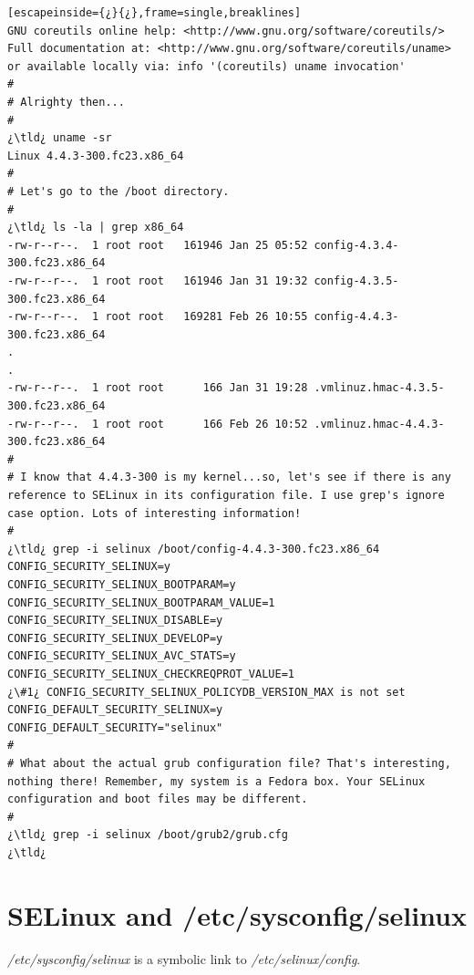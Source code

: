 \begin{lstlisting}[escapeinside={¿}{¿},frame=single,breaklines]
GNU coreutils online help: <http://www.gnu.org/software/coreutils/>
Full documentation at: <http://www.gnu.org/software/coreutils/uname>
or available locally via: info '(coreutils) uname invocation'
#
# Alrighty then...
#
¿\tld¿ uname -sr
Linux 4.4.3-300.fc23.x86_64
#
# Let's go to the /boot directory.
#
¿\tld¿ ls -la | grep x86_64
-rw-r--r--.  1 root root   161946 Jan 25 05:52 config-4.3.4-300.fc23.x86_64
-rw-r--r--.  1 root root   161946 Jan 31 19:32 config-4.3.5-300.fc23.x86_64
-rw-r--r--.  1 root root   169281 Feb 26 10:55 config-4.4.3-300.fc23.x86_64
.
.
-rw-r--r--.  1 root root      166 Jan 31 19:28 .vmlinuz.hmac-4.3.5-300.fc23.x86_64
-rw-r--r--.  1 root root      166 Feb 26 10:52 .vmlinuz.hmac-4.4.3-300.fc23.x86_64
#
# I know that 4.4.3-300 is my kernel...so, let's see if there is any reference to SELinux in its configuration file. I use grep's ignore case option. Lots of interesting information!
#
¿\tld¿ grep -i selinux /boot/config-4.4.3-300.fc23.x86_64
CONFIG_SECURITY_SELINUX=y
CONFIG_SECURITY_SELINUX_BOOTPARAM=y
CONFIG_SECURITY_SELINUX_BOOTPARAM_VALUE=1
CONFIG_SECURITY_SELINUX_DISABLE=y
CONFIG_SECURITY_SELINUX_DEVELOP=y
CONFIG_SECURITY_SELINUX_AVC_STATS=y
CONFIG_SECURITY_SELINUX_CHECKREQPROT_VALUE=1
¿\#1¿ CONFIG_SECURITY_SELINUX_POLICYDB_VERSION_MAX is not set
CONFIG_DEFAULT_SECURITY_SELINUX=y
CONFIG_DEFAULT_SECURITY="selinux"
#
# What about the actual grub configuration file? That's interesting, nothing there! Remember, my system is a Fedora box. Your SELinux configuration and boot files may be different.
#
¿\tld¿ grep -i selinux /boot/grub2/grub.cfg
¿\tld¿ 
\end{lstlisting}

\section{SELinux and /etc/sysconfig/selinux}

\textsl{/etc/sysconfig/selinux} is a symbolic link to \textsl{/etc/selinux/config}.

